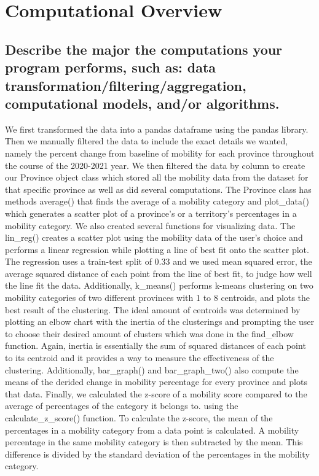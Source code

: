 \documentclass[fontsize=11pt]{article}
\begin{document}
    \section*{Computational Overview}

    \subsection{Describe the major the computations your program performs, such as: data transformation/filtering/aggregation, computational models, and/or algorithms.
    }
    \hspace{\parindent} We first transformed the data into a pandas dataframe using the pandas library. Then we manually filtered the data to include the exact details we wanted, namely the percent change from baseline of mobility for each province throughout the course of the 2020-2021 year. We then filtered the data by column to create our Province object class which stored all the mobility data from the dataset for that specific province as well as did several computations. The Province class has methods average() that finds the average of a mobility category and plot\_data() which generates a scatter plot of a province’s or a territory’s percentages in a mobility category. We also created several functions for visualizing data. The lin\_reg() creates a scatter plot using the mobility data of the user's choice and performs a linear regression while plotting a line of best fit onto the scatter plot. The regression uses a train-test split of 0.33 and we used mean squared error, the average squared distance of each point from the line of best fit, to judge how well the line fit the data. Additionally, k\_means() performs k-means clustering on two mobility categories of two different provinces with 1 to 8 centroids, and plots the best result of the clustering. The ideal amount of centroids was determined by plotting an elbow chart with the inertia of the clusterings and prompting the user to choose their desired amount of clusters which was done in the find\_elbow function. Again, inertia is essentially the sum of squared distances of each point to its centroid and it provides a way to measure the effectiveness of the clustering. Additionally, bar\_graph() and bar\_graph\_two() also compute the means of the derided change in mobility percentage for every province and plots that data. Finally, we calculated the z-score of a mobility score compared to the average of percentages of the category it belongs to. using the calculate\_z\_score() function. To calculate the z-score, the mean of the percentages in a mobility category from a data point is calculated. A mobility percentage in the same mobility category is then subtracted by the mean. This difference is divided by the standard deviation of the percentages in the mobility category.
\end{document}
